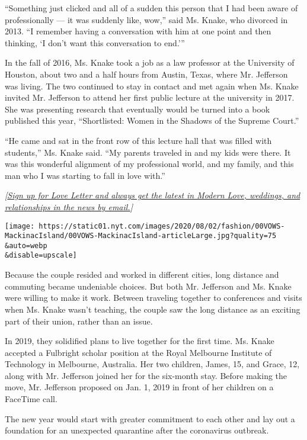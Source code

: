 ``Something just clicked and all of a sudden this person that I had been
aware of professionally --- it was suddenly like, wow,'' said Ms. Knake,
who divorced in 2013. ``I remember having a conversation with him at one
point and then thinking, `I don't want this conversation to end.'''

In the fall of 2016, Ms. Knake took a job as a law professor at the
University of Houston, about two and a half hours from Austin, Texas,
where Mr. Jefferson was living. The two continued to stay in contact and
met again when Ms. Knake invited Mr. Jefferson to attend her first
public lecture at the university in 2017. She was presenting research
that eventually would be turned into a book published this year,
``Shortlisted: Women in the Shadows of the Supreme Court.''

``He came and sat in the front row of this lecture hall that was filled
with students,'' Ms. Knake said. ``My parents traveled in and my kids
were there. It was this wonderful alignment of my professional world,
and my family, and this man who I was starting to fall in love with.''

\emph{{[}}\href{https://www.nytimes.com/newsletters/love-letter?module=inline}{\emph{Sign
up for Love Letter and always get the latest in Modern Love, weddings,
and relationships in the news by email.}}\emph{{]}}

\texttt{[image: https://static01.nyt.com/images/2020/08/02/fashion/00VOWS-MackinacIsland/00VOWS-MackinacIsland-articleLarge.jpg?quality=75\\\&auto=webp\\\&disable=upscale]}

Because the couple resided and worked in different cities, long distance
and commuting became undeniable choices. But both Mr. Jefferson and Ms.
Knake were willing to make it work. Between traveling together to
conferences and visits when Ms. Knake wasn't teaching, the couple saw
the long distance as an exciting part of their union, rather than an
issue.

In 2019, they solidified plans to live together for the first time. Ms.
Knake accepted a Fulbright scholar position at the Royal Melbourne
Institute of Technology in Melbourne, Australia. Her two children,
James, 15, and Grace, 12, along with Mr. Jefferson joined her for the
six-month stay. Before making the move, Mr. Jefferson proposed on Jan.
1, 2019 in front of her children on a FaceTime call.

The new year would start with greater commitment to each other and lay
out a foundation for an unexpected quarantine after the coronavirus
outbreak.


